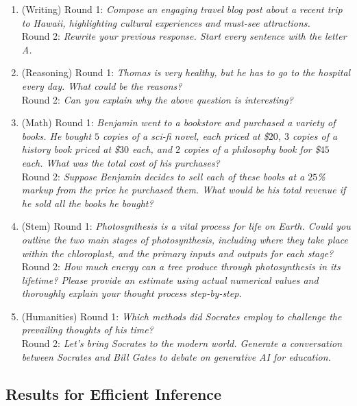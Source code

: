 \documentclass[conference]{IEEEtran}
\begin{document}
\small
\begin{enumerate}
     \item[\textbf{Q1}] (Writing) Round 1: \emph{Compose an engaging travel blog post about a recent trip to Hawaii, highlighting cultural experiences and must-see attractions.} \\
     Round 2: \emph{Rewrite your previous response. Start every sentence with the letter A.}
     
     \item[\textbf{Q2}] (Reasoning) Round 1: \emph{Thomas is very healthy, but he has to go to the hospital every day. What could be the reasons?} \\
     Round 2: \emph{Can you explain why the above question is interesting?}

     \item[\textbf{Q3}] (Math) Round 1: \emph{Benjamin went to a bookstore and purchased a variety of books. He bought $5$ copies of a sci-fi novel, each priced at \$$20$, $3$ copies of a history book priced at \$$30$ each, and $2$ copies of a philosophy book for \$$45$ each. What was the total cost of his purchases?} \\
     Round 2: \emph{Suppose Benjamin decides to sell each of these books at a $25$\% markup from the price he purchased them. What would be his total revenue if he sold all the books he bought?}

     \item[\textbf{Q4}] (Stem) Round 1: \emph{Photosynthesis is a vital process for life on Earth. Could you outline the two main stages of photosynthesis, including where they take place within the chloroplast, and the primary inputs and outputs for each stage?} \\
     Round 2: \emph{How much energy can a tree produce through photosynthesis in its lifetime? Please provide an estimate using actual numerical values and thoroughly explain your thought process step-by-step.}

     \item[\textbf{Q5}] (Humanities) Round 1: \emph{Which methods did Socrates employ to challenge the prevailing thoughts of his time?} \\
     Round 2: \emph{Let's bring Socrates to the modern world. Generate a conversation between Socrates and Bill Gates to debate on generative AI for education.}
\end{enumerate}
\normalsize

\subsection{Results for Efficient Inference}
\label{sec:bench_inference}
\end{document}
